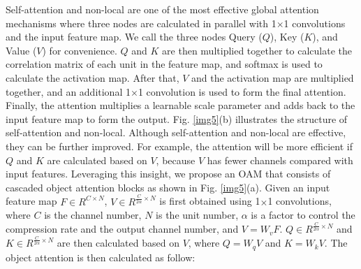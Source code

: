 \documentclass[letterpaper, 10 pt, conference]{ieeeconf}  %
\begin{document}
Self-attention \cite{Zhang2019} and non-local \cite{Wang2017} are one of the most effective global attention mechanisms where three nodes are calculated in parallel with 1$\times$1 convolutions and the input feature map. We call the three nodes Query ($Q$), Key ($K$), and Value ($V$) for convenience. $Q$ and $K$ are then multiplied together to calculate the correlation matrix of each unit in the feature map, and softmax is used to calculate the activation map. After that, $V$ and the activation map are multiplied together, and an additional 1$\times$1 convolution is used to form the final attention. Finally, the attention multiplies a learnable scale parameter and adds back to the input feature map to form the output. Fig. \ref{img5}(b) illustrates the structure of self-attention and non-local. Although self-attention and non-local are effective, they can be further improved. For example, the attention will be more efficient if $Q$ and $K$ are calculated based on $V$, because $V$ has fewer channels compared with input features. Leveraging this insight, we propose an OAM that consists of cascaded object attention blocks as shown in Fig. \ref{img5}(a). Given an input feature map $F\in{R^{C\times N}}$, $V\in{R^{\frac{C}{2\alpha} \times N}}$ is first obtained using 1$\times$1 convolutions, where $C$ is the channel number, $N$ is the unit number, $\alpha$ is a factor to control the compression rate and the output channel number, and $V=W_{v}F$. $Q\in{R^{\frac{C}{2\alpha} \times N}}$ and $K\in{R^{\frac{C}{2\alpha} \times N}}$ are then calculated based on $V$, where $Q=W_{q}V$ and $K=W_{k}V$. The object attention is then calculated as follow:

\end{document}
